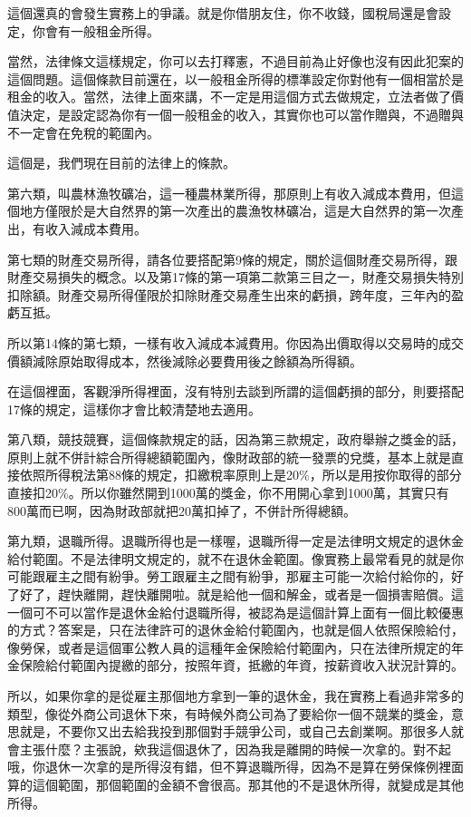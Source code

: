 \documentclass[]{ctexbook}
\begin{document}
這個還真的會發生實務上的爭議。就是你借朋友住，你不收錢，國稅局還是會設定，你會有一般租金所得。

當然，法律條文這樣規定，你可以去打釋憲，不過目前為止好像也沒有因此犯案的這個問題。這個條款目前還在，以一般租金所得的標準設定你對他有一個相當於是租金的收入。當然，法律上面來講，不一定是用這個方式去做規定，立法者做了價值決定，是設定認為你有一個一般租金的收入，其實你也可以當作贈與，不過贈與不一定會在免稅的範圍內。

這個是，我們現在目前的法律上的條款。

第六類，叫農林漁牧礦冶，這一種農林業所得，那原則上有收入減成本費用，但這個地方僅限於是大自然界的第一次產出的農漁牧林礦冶，這是大自然界的第一次產出，有收入減成本費用。

第七類的財產交易所得，請各位要搭配第9條的規定，關於這個財產交易所得，跟財產交易損失的概念。以及第17條的第一項第二款第三目之一，財產交易損失特別扣除額。財產交易所得僅限於扣除財產交易產生出來的虧損，跨年度，三年內的盈虧互抵。

所以第14條的第七類，一樣有收入減成本減費用。你因為出價取得以交易時的成交價額減除原始取得成本，然後減除必要費用後之餘額為所得額。

在這個裡面，客觀淨所得裡面，沒有特別去談到所謂的這個虧損的部分，則要搭配17條的規定，這樣你才會比較清楚地去適用。

第八類，競技競賽，這個條款規定的話，因為第三款規定，政府舉辦之獎金的話，原則上就不併計綜合所得總額範圍內，像財政部的統一發票的兌獎，基本上就是直接依照所得稅法第88條的規定，扣繳稅率原則上是20\%，所以是用按你取得的部分直接扣20\%。所以你雖然開到1000萬的獎金，你不用開心拿到1000萬，其實只有800萬而已啊，因為財政部就把20萬扣掉了，不併計所得總額。

第九類，退職所得。退職所得也是一樣喔，退職所得一定是法律明文規定的退休金給付範圍。不是法律明文規定的，就不在退休金範圍。像實務上最常看見的就是你可能跟雇主之間有紛爭。勞工跟雇主之間有紛爭，那雇主可能一次給付給你的，好了好了，趕快離開，趕快離開啦。就是給他一個和解金，或者是一個損害賠償。這一個可不可以當作是退休金給付退職所得，被認為是這個計算上面有一個比較優惠的方式？答案是，只在法律許可的退休金給付範圍內，也就是個人依照保險給付，像勞保，或者是這個軍公教人員的這種年金保險給付範圍內，只在法律所規定的年金保險給付範圍內提繳的部分，按照年資，抵繳的年資，按薪資收入狀況計算的。

所以，如果你拿的是從雇主那個地方拿到一筆的退休金，我在實務上看過非常多的類型，像從外商公司退休下來，有時候外商公司為了要給你一個不競業的獎金，意思就是，不要你又出去給我投到那個對手競爭公司，或自己去創業啊。那很多人就會主張什麼？主張說，欸我這個退休了，因為我是離開的時候一次拿的。對不起哦，你退休一次拿的是所得沒有錯，但不算退職所得，因為不是算在勞保條例裡面算的這個範圍，那個範圍的金額不會很高。那其他的不是退休所得，就變成是其他所得。
\end{document}
